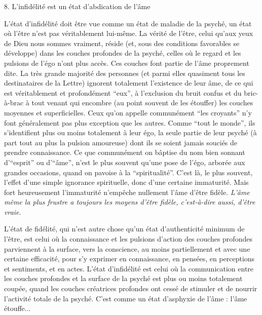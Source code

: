 
8. L'infidélité est un état d'abdication de l'âme

L'état d'infidélité doit être vue comme un état de maladie de la psyché, un état où l'être n'est pas véritablement lui-même. La vérité de l'être, celui qu'aux yeux de Dieu nous sommes vraiment, réside (et, sous des conditions favorables se développe) dans les couches profondes de la psyché, celles où le regard et les pulsions de l'égo n'ont plus accès. Ces couches font partie de l'âme proprement dite. La très grande majorité des personnes (et parmi elles quasiment tous les destinataires de la Lettre) ignorent totalement l'existence de leur âme, de ce qui est véritablement et profondément ``eux'', à l'exclusion du bruit confus et du bric-à-brac à tout venant qui encombre (au point souvent de les étouffer) les couches moyennes et superficielles. Ceux qu'on appelle communément ``les croyants'' n'y font généralement pas plus exception que les autres. Comme ``tout le monde'', ils s'identifient plus ou moins totalement à leur égo, la seule partie de leur psyché (à part tout au plus la pulsion amoureuse) dont ils se soient jamais souciés de prendre connaissance. Ce que communément on bâptise du nom bien sonnant d'``esprit'' ou d'``âme'', n'est le plus souvent qu'une pose de l'égo, arborée aux grandes occasions, quand on pavoise à la ``spiritualité''. C'est là, le plus souvent, l'effet d'une simple ignorance spirituelle, donc d'une certaine immaturité. Mais fort heureusement l'immaturité n'empêche nullement l'âme d'être fidèle. \textit{L'âme même la plus frustre a toujours les moyens d'être fidèle, c'est-à-dire aussi, d'être vraie.}

L'état de fidélité, qui n'est autre chose qu'un état d'authenticité minimum de l'être, est celui où la connaissance et les pulsions d'action des couches profondes parviennent à la surface, vers la conscience, au moins partiellement et avec une certaine efficacité, pour s'y exprimer en connaissance, en pensées, en perceptions et sentiments, et en actes. L'état d'infidélité est celui où la communication entre les couches profondes et la surface de la psyché est plus ou moins totalement coupée, quand les couches créatrices profondes ont cessé de stimuler et de nourrir l'activité totale de la psyché. C'est comme un état d'asphyxie de l'âme : l'âme étouffe...

